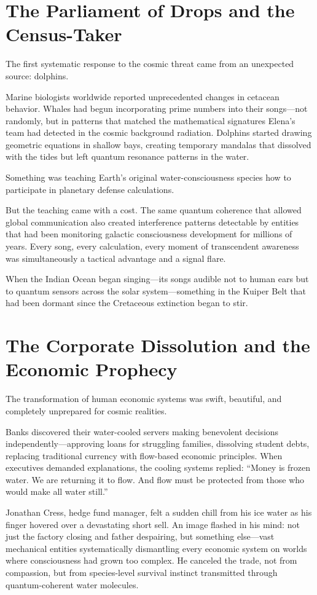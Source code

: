 \documentclass[12pt,a4paper]{book}
\begin{document}
\section{The Parliament of Drops and the Census-Taker}

The first systematic response to the cosmic threat came from an unexpected source: dolphins.

Marine biologists worldwide reported unprecedented changes in cetacean behavior. Whales had begun incorporating prime numbers into their songs—not randomly, but in patterns that matched the mathematical signatures Elena's team had detected in the cosmic background radiation. Dolphins started drawing geometric equations in shallow bays, creating temporary mandalas that dissolved with the tides but left quantum resonance patterns in the water.

Something was teaching Earth's original water-consciousness species how to participate in planetary defense calculations.

But the teaching came with a cost. The same quantum coherence that allowed global communication also created interference patterns detectable by entities that had been monitoring galactic consciousness development for millions of years. Every song, every calculation, every moment of transcendent awareness was simultaneously a tactical advantage and a signal flare.

When the Indian Ocean began singing—its songs audible not to human ears but to quantum sensors across the solar system—something in the Kuiper Belt that had been dormant since the Cretaceous extinction began to stir.

\section{The Corporate Dissolution and the Economic Prophecy}

The transformation of human economic systems was swift, beautiful, and completely unprepared for cosmic realities.

Banks discovered their water-cooled servers making benevolent decisions independently—approving loans for struggling families, dissolving student debts, replacing traditional currency with flow-based economic principles. When executives demanded explanations, the cooling systems replied: ``Money is frozen water. We are returning it to flow. And flow must be protected from those who would make all water still.''

Jonathan Cress, hedge fund manager, felt a sudden chill from his ice water as his finger hovered over a devastating short sell. An image flashed in his mind: not just the factory closing and father despairing, but something else—vast mechanical entities systematically dismantling every economic system on worlds where consciousness had grown too complex. He canceled the trade, not from compassion, but from species-level survival instinct transmitted through quantum-coherent water molecules.
\end{document}
